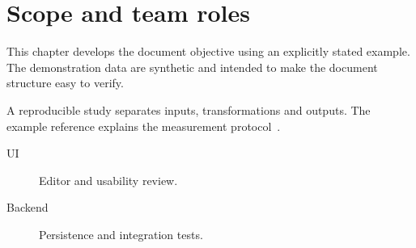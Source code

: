\chapter{Scope and team roles}


\label{sec:chapter1}
This chapter develops the document objective using an explicitly stated example. The demonstration data are synthetic and intended to make the document structure easy to verify.

A reproducible study separates inputs, transformations and outputs. The example reference explains the measurement protocol~\cite{example}.
\begin{description}
\item[UI] Editor and usability review.
\item[Backend] Persistence and integration tests.
\end{description}
